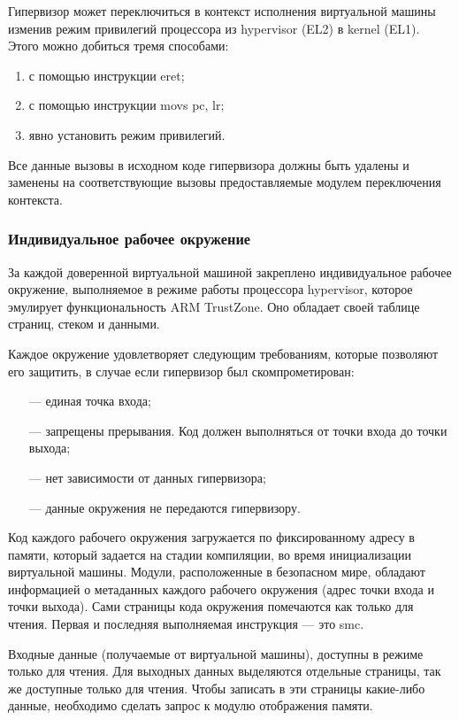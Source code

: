 Гипервизор может переключиться в контекст исполнения виртуальной машины изменив режим привилегий процессора из hypervisor (EL2) в kernel (EL1). Этого можно добиться тремя способами:

\begin{enumerate}[label*=\arabic*.]
	\item с помощью инструкции eret;
	\item с помощью инструкции movs pc, lr;
	\item явно установить режим привилегий.
\end{enumerate}

Все данные вызовы в исходном коде гипервизора должны быть удалены и заменены на соответствующие вызовы предоставляемые модулем переключения контекста.

\subsubsection{Индивидуальное рабочее окружение}

За каждой доверенной виртуальной машиной закреплено индивидуальное рабочее окружение, выполняемое в режиме работы процессора hypervisor, которое эмулирует функциональность ARM TrustZone. Оно обладает своей таблице страниц, стеком и данными.

Каждое окружение удовлетворяет следующим требованиям, которые позволяют его защитить, в случае если гипервизор был скомпрометирован:

\begin{itemize}
	\item [---] единая точка входа;
	\item [---] запрещены прерывания. Код должен выполняться от точки входа до точки выхода;
	\item [---] нет зависимости от данных гипервизора;
	\item [---] данные окружения не передаются гипервизору.
\end{itemize}

Код каждого рабочего окружения загружается по фиксированному адресу в памяти, который задается на стадии компиляции, во время инициализации виртуальной машины. Модули, расположенные в безопасном мире, обладают информацией о метаданных каждого рабочего окружения (адрес точки входа и точки выхода). Сами страницы кода окружения помечаются как только для чтения. Первая и последняя выполняемая инструкция --- это smc. 

Входные данные (получаемые от виртуальной машины), доступны в режиме только для чтения. Для выходных данных выделяются отдельные страницы, так же доступные только для чтения. Чтобы записать в эти страницы какие-либо данные, необходимо сделать запрос к модулю отображения памяти. 

